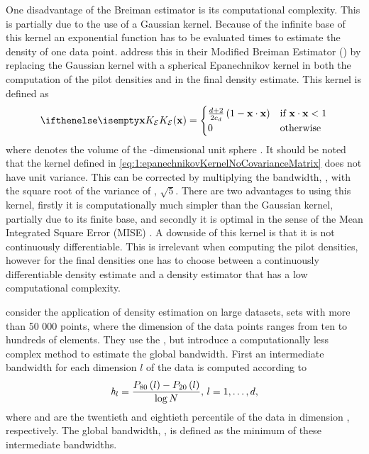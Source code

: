 	One disadvantage of the Breiman estimator is its computational complexity. This is partially due to the use of a Gaussian kernel. Because of the infinite base of this kernel an exponential function has to be evaluated \varNumPatterns times to estimate the density of one data point. 
	\textcite{wilkinson1995dataplot} address this in their Modified Breiman Estimator (\mbe) by replacing the Gaussian kernel with a spherical Epanechnikov kernel in both the computation of the pilot densities and in the final density estimate. This kernel is defined as
	\begin{equation}\label{eq:1:epanechnikovKernelNoCovarianceMatrix}
		\varKernel[\varEpan]{\varPattern} = 
		\begin{cases}
			\frac{\varDim + 2}{2\varUnitSphere{\varDim}} \left( 1 - \varPattern \cdot \varPattern \right) & \text{if } \varPattern \cdot \varPattern < 1\\
			0 & \text{otherwise}
		\end{cases}
	\end{equation}
	 where \varUnitSphere{\varDim} denotes the volume of the \varDim-dimensional unit sphere \cite{epanechnikov1969non}. It should be noted that the kernel defined in \cref{eq:1:epanechnikovKernelNoCovarianceMatrix} does not have unit variance. This can be corrected by multiplying the bandwidth, \varBandwidth,  with the square root of the variance of \varKernel[\varEpan]{}, \ie $\sqrt{5}$. There are two advantages to using this kernel, firstly it is computationally much simpler than the Gaussian kernel, partially due to its finite base, and secondly it is optimal in the sense of the Mean Integrated Square Error (MISE) \cite{epanechnikov1969non}. A downside of this kernel is that it is not continuously differentiable. This is irrelevant when computing the pilot densities, however for the final densities one has to choose between a continuously differentiable density estimate and a density estimator that has a low computational complexity.

	\textcite{ferdosi2011comparison} consider the application of density estimation on large datasets, \ie sets with more than 50 000 points, where the dimension of the data points ranges from ten to hundreds of elements. They use the \mbe, but introduce a computationally less complex method to estimate the global bandwidth. First an intermediate bandwidth for each dimension $l$ of the data is computed according to		
	\begin{equation}\label{eq:1:ferdosiGeneralBandwidth}
			\mathit{h}_{l} = \frac{P_{80}\left( l \right) - P_{20}\left( l \right)}{\log N}, \, l = 1, \dotsc, d,
		\end{equation}
	where  and  are the twentieth and eightieth percentile of the data in dimension \itDim, respectively. The global bandwidth, \varBandwidth, is defined as the minimum of these intermediate bandwidths.

